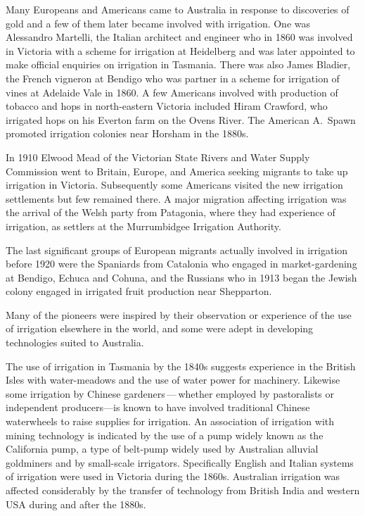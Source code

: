 Many Europeans and Americans came to Australia in response to
discoveries of gold and a few of them later became involved with
irrigation.  One was Alessandro Martelli,  the
Italian architect and engineer who in 1860 was involved in Victoria
with a scheme for irrigation at Heidelberg and was later appointed to
make official enquiries on irrigation in Tasmania.  There was also
James Bladier,  the French vigneron at Bendigo who
was partner in a scheme for irrigation of vines at Adelaide Vale in
1860.  A few Americans involved with production of tobacco and hops in
north-eastern Victoria included Hiram Crawford, 
who irrigated hops on his Everton farm on the Ovens River.
 The American A.~Spawn  promoted
irrigation colonies near Horsham  in the 1880s.

In 1910 Elwood Mead of the Victorian State Rivers and Water Supply
Commission went to Britain, Europe, and America seeking migrants to
take up irrigation in Victoria.  Subsequently some Americans visited
the new irrigation settlements but few remained there.  A major
migration affecting irrigation was the arrival of the Welsh party from
Patagonia, where they had experience of irrigation, as settlers at the
Murrumbidgee Irrigation Authority.

The last significant groups of European migrants actually involved in
irrigation before 1920 were the Spaniards  from
Catalonia who engaged in market-gardening at Bendigo, Echuca and
Cohuna, and the Russians  who in 1913 began the Jewish
colony engaged in irrigated fruit production near Shepparton.

\bigskip\noindent
Many of the pioneers were inspired by their observation or experience
of the use of irrigation elsewhere in the world, and some were adept
in developing technologies suited to Australia.

The use of irrigation in Tasmania by the 1840s suggests experience in
the British Isles with water-meadows and the use of water power for
machinery.  Likewise some irrigation by Chinese
gardeners\,---\,whether employed by pastoralists or independent
producers---is known to have involved traditional Chinese
waterwheels to raise supplies for irrigation.  An association of
irrigation with mining technology is indicated by the use of a pump
widely known as the California pump,  a type
of belt-pump  widely used by Australian alluvial
goldminers and by small-scale irrigators.  Specifically English and
Italian systems of irrigation were used in Victoria during the
1860s. Australian irrigation was affected considerably by the transfer
of technology from British India and western USA during and after the
1880s.

